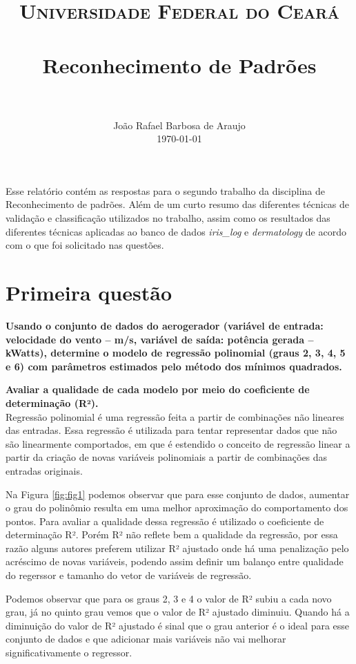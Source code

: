 \documentclass[paper=a4, fontsize=11pt]{scrartcl}
\title{
	\usefont{OT1}{bch}{b}{n}
	\normalfont \normalsize \textsc{Universidade Federal do Ceará} \\ [25pt]
	\horrule{0.5pt} \\[0.4cm]
	\huge Reconhecimento de Padrões \\
	\horrule{2pt} \\[0.5cm]
}
\author{
	\normalfont 								\normalsize
	João Rafael Barbosa de Araujo\\[-3pt]		\normalsize
	\today
}
\date{}
\numberwithin{equation}{section}		%
\numberwithin{figure}{section}			%
\numberwithin{table}{section}				%
\begin{document}
	\maketitle
	
	Esse relatório contém as respostas para o segundo trabalho da disciplina de Reconhecimento de padrões. Além de um curto resumo das diferentes técnicas de validação e classificação utilizados no trabalho, assim como os resultados das diferentes técnicas aplicadas ao banco de dados \textit{iris\_log} e \textit{dermatology} de acordo com o que foi solicitado nas questões.
	
	\newpage
	
	\section{Primeira questão}
	
	\textbf{Usando o conjunto de dados do aerogerador (variável de entrada: velocidade do vento – m/s, variável de saída: potência gerada – kWatts), determine o modelo de regressão polinomial (graus 2, 3, 4, 5 e 6) com parâmetros estimados pelo método dos mínimos quadrados.}
	
	
	\textbf{ Avaliar a qualidade de cada modelo por meio do coeficiente de determinação (R²). }\\
	
	Regressão polinomial é uma regressão feita a partir de combinações não lineares das entradas. Essa regressão é utilizada para tentar representar dados que não são linearmente comportados, em que é estendido o conceito de regressão linear a partir da criação de novas variáveis polinomiais a partir de combinações das entradas originais.
	
	Na Figura \ref{fig:fig1} podemos observar que para esse conjunto de dados, aumentar o grau do polinômio resulta em uma melhor aproximação do comportamento dos pontos. Para avaliar a qualidade dessa regressão é utilizado o coeficiente de determinação R². Porém R² não reflete bem a qualidade da regressão, por essa razão alguns autores preferem utilizar R² ajustado onde há uma penalização pelo acréscimo de novas variáveis, podendo assim definir um balanço entre qualidade do regerssor e tamanho do vetor de variáveis de regressão.
	
	Podemos observar que para os graus 2, 3 e 4 o valor de R² subiu a cada novo grau, já no quinto grau vemos que o valor de R² ajustado diminuiu. Quando há a diminuição do valor de R² ajustado é sinal que o grau anterior é o ideal para esse conjunto de dados e que adicionar mais variáveis não vai melhorar significativamente o regressor.
	
\end{document}
